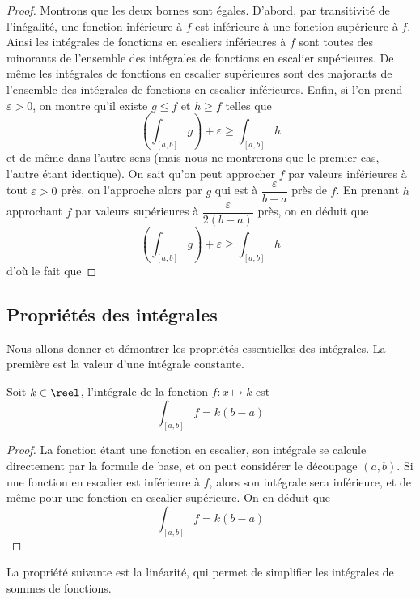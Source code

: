 \begin{proof}
    Montrons que les deux bornes sont égales. D'abord, par transitivité de l'inégalité, une fonction inférieure à $f$ est inférieure à une fonction supérieure à $f$. Ainsi les intégrales de fonctions en escaliers inférieures à $f$ sont toutes des minorants de l'ensemble des intégrales de fonctions en escalier supérieures. De même les intégrales de fonctions en escalier supérieures sont des majorants de l'ensemble des intégrales de fonctions en escalier inférieures. Enfin, si l'on prend $\varepsilon > 0$, on montre qu'il existe $g\leq f$ et $h \geq f$ telles que $$\left(\int_{[a,b]} g\right)+\varepsilon \geq \int_{[a,b]} h$$ et de même dans l'autre sens (mais nous ne montrerons que le premier cas, l'autre étant identique). On sait qu'on peut approcher $f$ par valeurs inférieures à tout $\varepsilon > 0$ près, on l'approche alors par $g$ qui est à $\dfrac{\varepsilon}{b-a}$ près de $f$. En prenant $h$ approchant $f$ par valeurs supérieures à $\dfrac{\varepsilon}{2(b-a)}$ près, on en déduit que $$\left(\int_{[a,b]} g\right)+\varepsilon \geq \int_{[a,b]} h$$ d'où le fait que 
\end{proof}

\subsection{Propriétés des intégrales}

Nous allons donner et démontrer les propriétés essentielles des intégrales. La première est la valeur d'une intégrale constante.

\begin{prop}
    Soit $k\in\reel$, l'intégrale de la fonction $f : x \mapsto k$ est $$\int_{[a,b]} f = k(b-a)$$
\end{prop}

\begin{proof}
    La fonction étant une fonction en escalier, son intégrale se calcule directement par la formule de base, et on peut considérer le découpage $(a,b)$. Si une fonction en escalier est inférieure à $f$, alors son intégrale sera inférieure, et de même pour une fonction en escalier supérieure. On en déduit que $$\boxed{\int_{[a,b]} f = k(b-a)}$$
\end{proof}

La propriété suivante est la linéarité, qui permet de simplifier les intégrales de sommes de fonctions.

